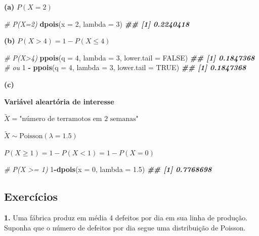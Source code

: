 \documentclass[
]{book}
\newenvironment{Shaded}{\begin{snugshade}}{\end{snugshade}}
\newcommand{\AttributeTok}[1]{\textcolor[rgb]{0.13,0.29,0.53}{#1}}
\newcommand{\CommentTok}[1]{\textcolor[rgb]{0.56,0.35,0.01}{\textit{#1}}}
\newcommand{\ConstantTok}[1]{\textcolor[rgb]{0.56,0.35,0.01}{#1}}
\newcommand{\DecValTok}[1]{\textcolor[rgb]{0.00,0.00,0.81}{#1}}
\newcommand{\DocumentationTok}[1]{\textcolor[rgb]{0.56,0.35,0.01}{\textbf{\textit{#1}}}}
\newcommand{\FloatTok}[1]{\textcolor[rgb]{0.00,0.00,0.81}{#1}}
\newcommand{\FunctionTok}[1]{\textcolor[rgb]{0.13,0.29,0.53}{\textbf{#1}}}
\newcommand{\NormalTok}[1]{#1}
\newcommand{\SpecialCharTok}[1]{\textcolor[rgb]{0.81,0.36,0.00}{\textbf{#1}}}
\begin{document}
\textbf{(a)} \(P(X=2)\)

\begin{Shaded}
\begin{Highlighting}[]
\CommentTok{\# P(X=2)}
\FunctionTok{dpois}\NormalTok{(}\AttributeTok{x =} \DecValTok{2}\NormalTok{, }\AttributeTok{lambda =} \DecValTok{3}\NormalTok{)}
\DocumentationTok{\#\# [1] 0.2240418}
\end{Highlighting}
\end{Shaded}

\textbf{(b)} \(P(X>4)=1-P(X\leq 4)\)

\begin{Shaded}
\begin{Highlighting}[]
\CommentTok{\# P(X\textgreater{}4)}
\FunctionTok{ppois}\NormalTok{(}\AttributeTok{q =} \DecValTok{4}\NormalTok{, }\AttributeTok{lambda =} \DecValTok{3}\NormalTok{, }\AttributeTok{lower.tail =} \ConstantTok{FALSE}\NormalTok{)}
\DocumentationTok{\#\# [1] 0.1847368}
\CommentTok{\# ou}
\DecValTok{1} \SpecialCharTok{{-}} \FunctionTok{ppois}\NormalTok{(}\AttributeTok{q =} \DecValTok{4}\NormalTok{, }\AttributeTok{lambda =} \DecValTok{3}\NormalTok{, }\AttributeTok{lower.tail =} \ConstantTok{TRUE}\NormalTok{)}
\DocumentationTok{\#\# [1] 0.1847368}
\end{Highlighting}
\end{Shaded}

\textbf{(c)}

\textbf{Variável aleartória de interesse}

\(\tilde{X} = \text{"número de terramotos em 2 semanas"}\)

\(\tilde{X} \sim \text{Poisson}(\lambda = 1.5)\)

\(P(X \geq 1) = 1-P(X < 1) = 1-P(X=0)\)

\begin{Shaded}
\begin{Highlighting}[]
\CommentTok{\# P(X \textgreater{}= 1)}
\DecValTok{1}\SpecialCharTok{{-}}\FunctionTok{dpois}\NormalTok{(}\AttributeTok{x =} \DecValTok{0}\NormalTok{, }\AttributeTok{lambda =} \FloatTok{1.5}\NormalTok{)}
\DocumentationTok{\#\# [1] 0.7768698}
\end{Highlighting}
\end{Shaded}

\subsection{Exercícios}\label{exercuxedcios-28}

\textbf{1.} Uma fábrica produz em média 4 defeitos por dia em sua linha de produção. Suponha que o número de defeitos por dia segue uma distribuição de Poisson.
\end{document}
